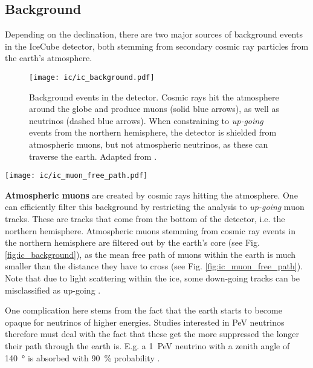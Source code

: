 \subsection{Background}\label{background}
Depending on the declination, there are two major sources of background events in the IceCube detector, both stemming from secondary cosmic ray particles from the earth's atmosphere.
\begin{figure}[htb]
    \texttt{[image: ic/ic\_background.pdf]}
    \caption[Background events]{Background events in the detector. Cosmic rays hit the atmosphere around the globe and produce muons (solid blue arrows), as well as neutrinos (dashed blue arrows). When constraining to \textit{up-going} events from the northern hemisphere, the detector is shielded from atmospheric muons, but not atmospheric neutrinos, as these can traverse the earth. Adapted from \cite{Ahlers2018a}.}
\end{figure}

\begin{marginfigure}
    \texttt{[image: ic/ic\_muon\_free\_path.pdf]}
    \caption[Muon free path in ice]{Free path length for \SI{1}{\peta\eV} muons in ice. The mean free path in ice is slightly longer than in rock. From \cite{Chirkin2004}.}
\end{marginfigure}

\textbf{Atmospheric muons} are created by cosmic rays hitting the atmosphere. One can efficiently filter this background by restricting the analysis to \textit{up-going} muon tracks. These are tracks that come from the bottom of the detector, i.e. the northern hemisphere. Atmospheric muons stemming from cosmic ray events in the northern hemisphere are filtered out by the earth's core (see Fig. \ref{fig:ic_background}), as the mean free path of muons within the earth is much smaller  than the distance they have to cross (see Fig. \ref{fig:ic_muon_free_path}). Note that due to light scattering within the ice, some down-going tracks can be misclassified as up-going .

One complication here stems from the fact that the earth starts to become opaque for neutrinos of higher energies. Studies interested in \si{\peta\eV} neutrinos therefore must deal with the fact that these get the more suppressed the longer their path through the earth is. E.g. a \SI{1}{\peta\eV} neutrino with a zenith angle of \SI{140}{\degree} is absorbed with \SI{90}{\percent} probability .

